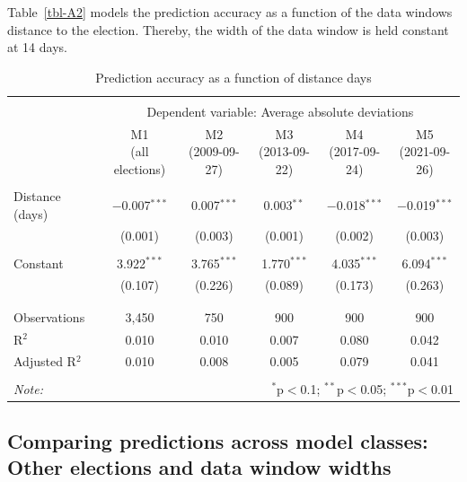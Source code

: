 \documentclass[
  letterpaper,
  DIV=11,
  numbers=noendperiod]{scrartcl}
\begin{document}
Table~\ref{tbl-A2} models the prediction accuracy as a function of the
data windows distance to the election. Thereby, the width of the data
window is held constant at 14 days.

\hypertarget{tbl-A2}{}
\begin{table}[!htbp] \centering 
  \caption{\label{tbl-A2}Prediction accuracy as a function of distance days } 
  \label{} 
\scriptsize 
\begin{tabular}{@{\extracolsep{5pt}}lccccc} 
\\[-1.8ex]\hline 
\hline \\[-1.8ex] 
 & \multicolumn{5}{c}{Dependent variable: Average absolute deviations} \\ 
\cline{2-6} 
 & \shortstack{M1 \\ (all elections)} & \shortstack{M2 \\ (2009-09-27)} & \shortstack{M3 \\ (2013-09-22)} & \shortstack{M4 \\ (2017-09-24)} & \shortstack{M5 \\ (2021-09-26)} \\ 
\hline \\[-1.8ex] 
 Distance (days) & $-$0.007$^{***}$ & 0.007$^{***}$ & 0.003$^{**}$ & $-$0.018$^{***}$ & $-$0.019$^{***}$ \\ 
  & (0.001) & (0.003) & (0.001) & (0.002) & (0.003) \\ 
  & & & & & \\ 
 Constant & 3.922$^{***}$ & 3.765$^{***}$ & 1.770$^{***}$ & 4.035$^{***}$ & 6.094$^{***}$ \\ 
  & (0.107) & (0.226) & (0.089) & (0.173) & (0.263) \\ 
  & & & & & \\ 
\hline \\[-1.8ex] 
Observations & 3,450 & 750 & 900 & 900 & 900 \\ 
R$^{2}$ & 0.010 & 0.010 & 0.007 & 0.080 & 0.042 \\ 
Adjusted R$^{2}$ & 0.010 & 0.008 & 0.005 & 0.079 & 0.041 \\ 
\hline 
\hline \\[-1.8ex] 
\textit{Note:}  & \multicolumn{5}{r}{$^{*}$p$<$0.1; $^{**}$p$<$0.05; $^{***}$p$<$0.01} \\ 
\end{tabular} 
\end{table}

\hypertarget{sec-comparing-model-classes-other}{%
\subsection{Comparing predictions across model classes: Other elections
and data window widths}\label{sec-comparing-model-classes-other}}
\end{document}
